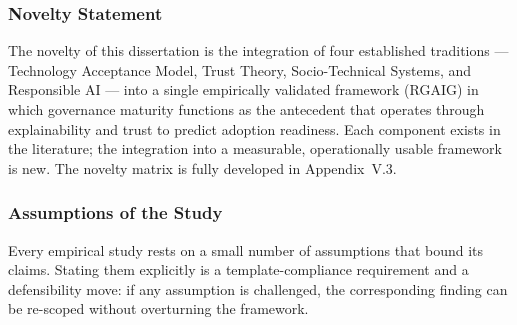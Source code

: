 \subsubsection{Novelty Statement}
\label{sec:ch1_novelty_statement}

\noindent The novelty of this dissertation is the integration of four established traditions --- Technology Acceptance Model, Trust Theory, Socio-Technical Systems, and Responsible AI --- into a single empirically validated framework (RGAIG) in which governance maturity functions as the antecedent that operates through explainability and trust to predict adoption readiness. Each component exists in the literature; the integration into a measurable, operationally usable framework is new. The novelty matrix is fully developed in Appendix~V.3.

\subsubsection{Assumptions of the Study}
\label{sec:ch1_assumptions}

\noindent Every empirical study rests on a small number of assumptions that bound its claims. Stating them explicitly is a template-compliance requirement and a defensibility move: if any assumption is challenged, the corresponding finding can be re-scoped without overturning the framework.

